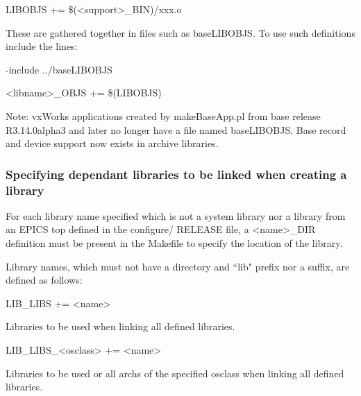 \begin{description}\item LIBOBJS += \$(\textless{}support\textgreater{}\_BIN)/xxx.o

\end{description}These are gathered together in files such as baseLIBOBJS. To use such definitions include the lines:

\begin{description}\item -include ../baseLIBOBJS

\item \textless{}libname\textgreater{}\_OBJS += \$(LIBOBJS)

\end{description}Note: vxWorks applications created by makeBaseApp.pl from base release R3.14.0alpha3 and later no longer have a file 
named baseLIBOBJS. Base record and device support now exists in archive libraries.

\subsubsection{Specifying dependant libraries to be linked when creating a library}

For each library name specified which is not a system library nor a library from an EPICS top defined in the configure/
RELEASE file, a \textless{}name\textgreater{}\_DIR definition must be present in the Makefile to specify the location of the library. 

Library names, which must not have a directory and ``lib" prefix nor a suffix, are defined as follows:

\begin{description}\item {}LIB\_LIBS += \textless{}name\textgreater{}

\end{description}Libraries to be used when linking all defined libraries.

\begin{description}\item LIB\_LIBS\_\textless{}osclass\textgreater{} += \textless{}name\textgreater{}

\end{description}Libraries to be used or all archs of the specified osclass when linking all defined libraries.

